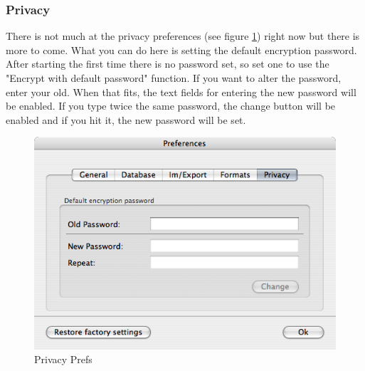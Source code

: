 \documentclass[12pt,a4]{article}
\begin{document}
\subsubsection{Privacy}
\label{prefs_privacy}
\medskip
There is not much at the privacy preferences (see figure \ref{image:privacyprefs}) right now but there is more to come. What you can do here is setting the default encryption password. After starting the first time there is no password set, so set one to use the "Encrypt with default password" function. If you want to alter the password, enter your old. When that fits, the text fields for entering the new password will be enabled. If you type twice the same password, the change button will be enabled and if you hit it, the new password will be set.
% 
\begin{figure}[ht]
\begin{center}
\includegraphics[width=13.5cm]{images/Prefs_Privacy.png}
\end{center}
\caption{Privacy Prefs}
\label{image:privacyprefs}
\end{figure}
\noindent
%
\clearpage
\newpage
\end{document}
